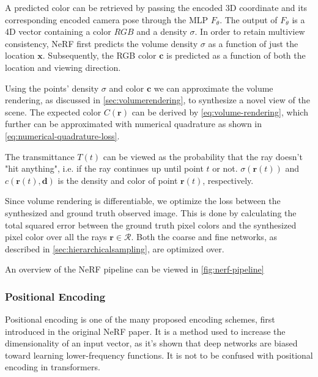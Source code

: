 

A predicted color can be retrieved by passing the encoded 3D coordinate and its corresponding encoded camera pose through the MLP $F_{\theta}$. The output of $F_\theta$ is a 4D vector containing a color $RGB$ and a density $\sigma$. In order to retain multiview consistency, NeRF first predicts the volume density $\sigma$ as a function of just the location $\textbf{x}$. Subsequently, the RGB color $\pmb{c}$ is predicted as a function of both the location and viewing direction.


Using the points' density $\sigma$ and color $\pmb{c}$ we can approximate the volume rendering, as discussed in \autoref{sec:volumerendering}, to synthesize a novel view of the scene. The expected color $C(\pmb{r})$ can be derived by \autoref{eq:volume-rendering}, which further can be approximated with numerical quadrature as shown in \autoref{eq:numerical-quadrature-loss}.





The transmittance $T(t)$ can be viewed as the probability that the ray doesn't "hit anything", i.e. if the ray continues up until point $t$ or not. $\sigma(\pmb{r}(t))$ and $c(\pmb{r}(t), \pmb{d})$ is the density and color of point $\pmb{r}(t)$, respectively.

Since volume rendering is differentiable, we optimize the loss between the synthesized and ground truth observed image. This is done by calculating the total squared error between the ground truth pixel colors and the synthesized pixel color over all the rays $\pmb{r} \in \mathcal{R}$. Both the coarse and fine networks, as described in \autoref{sec:hierarchicalsampling}, are optimized over.



An overview of the NeRF pipeline can be viewed in \autoref{fig:nerf-pipeline}

\subsubsection{Positional Encoding} \label{sec:positionalencoding}
Positional encoding is one of the many proposed encoding schemes, first introduced in the original NeRF paper. It is a method used to increase the dimensionality of an input vector, as it's shown that deep networks are biased toward learning lower-frequency functions. It is not to be confused with positional encoding in transformers. 

